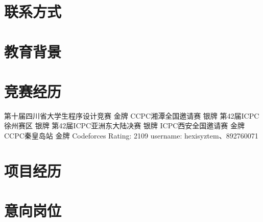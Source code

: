 \documentclass[11pt,a4paper,sans]{moderncv}   %
\begin{document}
\begin{CJK}{UTF8}{gbsn}                       %
\maketitle

\section{联系方式}

\section{教育背景}

\section{竞赛经历}
{ 
第十届四川省大学生程序设计竞赛 金牌 \newline
CCPC湘潭全国邀请赛 银牌\newline 
第42届ICPC徐州赛区 银牌\newline 
第42届ICPC亚洲东大陆决赛 银牌}{}{}{}{}
{ICPC西安全国邀请赛 金牌 \newline
CCPC秦皇岛站 金牌}{}{}{}{}
{Codeforces Rating: 2109 \newline
username: hexisyztem、892760071
}{}{}{}{}

\section{项目经历}

\section{意向岗位}

\nocite{*}



\clearpage\end{CJK}
\end{document}
